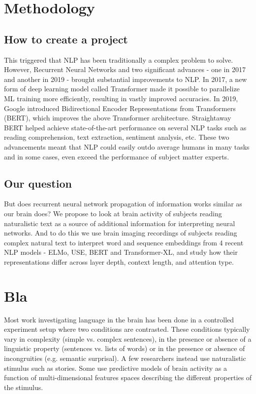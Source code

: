 \documentclass{article}
\begin{document}
\section{Methodology}  \label{sec:methodology}







  \subsection{How to create a project}
This triggered that NLP has been traditionally a complex problem to solve\cite{jones1992natural}. However, Recurrent Neural Networks and two significant advances - one in 2017 and another in 2019 - brought substantial improvements to NLP. In 2017, a new form of deep learning model called Transformer\cite{wang2019r} made it possible to parallelize ML training more efficiently, resulting in vastly improved accuracies.
In 2019, Google introduced Bidirectional Encoder Representations from Transformers (BERT)\cite{kamath2022bidirectional}, which improves the above Transformer architecture. Straightaway BERT helped achieve state-of-the-art performance\cite{DBLP:journals/corr/abs-1810-04805} on several NLP tasks such as reading comprehension, text extraction, sentiment analysis, etc. These two advancements meant that NLP could easily outdo average humans in many tasks and in some cases, even exceed the performance of subject matter experts. 
\subsection{Our question}
But does recurrent neural network propagation of information works similar as our brain does? We propose to look at brain activity of subjects reading naturalistic text as a source of additional information for interpreting neural networks. And to do this we use brain imaging recordings of subjects reading complex natural text to interpret word and sequence embeddings from 4 recent NLP models - ELMo, USE, BERT and Transformer-XL, and study how their representations differ across layer depth, context length, and attention type.

\section{Bla}
\label{sec:bla}

Most work investigating language in the brain has been done in a controlled experiment setup where two conditions are contrasted\cite{friederici2011brain}. These conditions typically vary in complexity (simple vs. complex sentences), in the presence or absence of a linguistic property (sentences vs. lists of words) or in the presence or absence of incongruities (e.g. semantic surprisal)\cite{friederici2011brain}. A few researchers instead use naturalistic stimulus such as stories\cite{brennan2012syntactic}. Some use predictive models of brain activity as a function of multi-dimensional features spaces describing the different properties of the stimulus\cite{wehbe2014simultaneously}.
\end{document}
